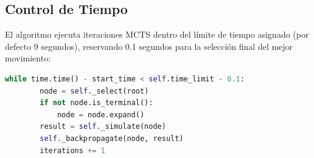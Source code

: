 \documentclass[a4paper, 12pt]{article}
\begin{document}
\subsection{Control de Tiempo}
El algoritmo ejecuta iteraciones MCTS dentro del límite de tiempo asignado (por defecto 9 segundos), reservando 0.1 segundos para la selección final del mejor movimiento:

\begin{lstlisting}[language=Python,caption=Bucle principal de búsqueda]
	while time.time() - start_time < self.time_limit - 0.1:
		node = self._select(root)
		if not node.is_terminal():
			node = node.expand()
		result = self._simulate(node)
		self._backpropagate(node, result)
		iterations += 1
\end{lstlisting}
\end{document}
